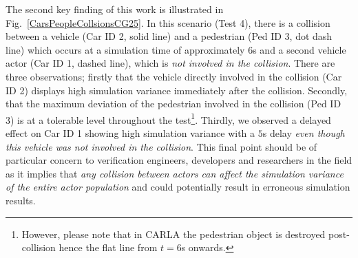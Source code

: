 \documentclass[runningheads,twocolumn,a4paper,10pt]{llncs}
\begin{document}
The second key finding of this work is illustrated in Fig.~\ref{CarsPeopleCollsionsCG25}. In this scenario (Test 4), there is a collision between a vehicle (Car ID 2, solid line) and a pedestrian (Ped ID 3, dot dash line) which occurs at a simulation time of approximately $6$s and a second vehicle actor (Car ID 1, dashed line), which is \textit{not involved in the collision}. There are three observations; firstly that the vehicle directly involved in the collision (Car ID 2) displays high simulation variance immediately after the collision.
Secondly, that the maximum deviation of the pedestrian involved in the collision (Ped ID 3) is at a tolerable level throughout the test\footnote{However, please note that in CARLA the pedestrian object is destroyed post-collision hence the flat line from $t=6$s onwards.}. Thirdly, we observed a delayed effect on Car ID 1 showing high simulation variance with a $5$s delay \textit{even though this vehicle was not involved in the collision}. This final point should be of particular concern to verification engineers, developers and researchers in the field as it implies that \textit{any collision between actors can affect the simulation variance of the entire actor population} and could potentially result in  erroneous simulation results. %





\end{document}
